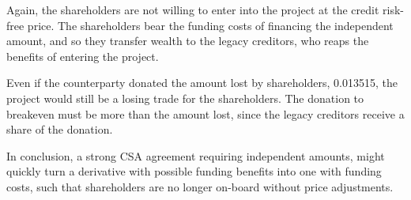 \documentclass[main.tex]{subfiles}
\begin{document}
        Again, the shareholders are not willing to enter into the project 
        at the credit risk-free price.
        The shareholders bear the funding costs of financing the independent amount,
        and so they transfer wealth to the legacy creditors, 
        who reaps the benefits of entering the project.
        
        Even if the counterparty donated the amount lost by shareholders, \num{0.013515},
        the project would still be a losing trade for the shareholders.
        The donation to breakeven must be more than the amount lost,
        since the legacy creditors receive a share of the donation. 

        In conclusion, a strong CSA agreement requiring independent amounts, 
        might quickly turn a derivative with possible funding benefits into one with funding costs, 
        such that shareholders are no longer on-board without price adjustments.
\end{document}
